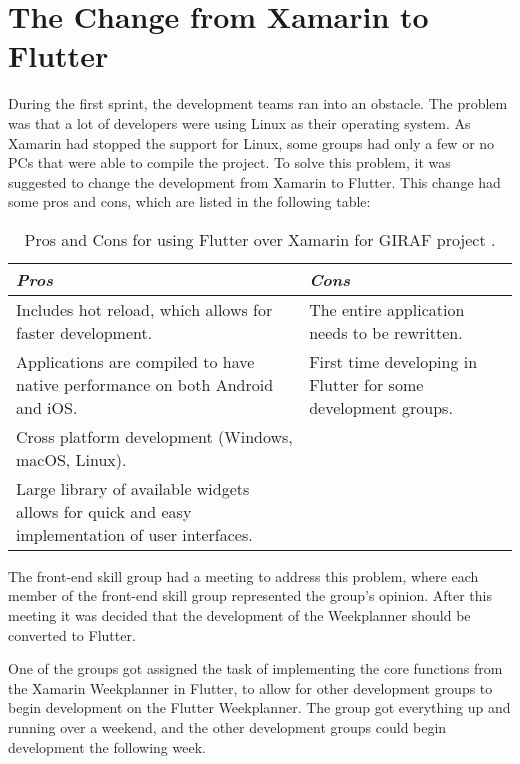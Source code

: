 \section{The Change from Xamarin to Flutter}
\label{sect:XamarinToFlutter}

During the first sprint, the development teams ran into an obstacle. The problem was that a lot of developers were using Linux as their operating system. As Xamarin had stopped the support for Linux, some groups had only a few or no PCs that were able to compile the project.
To solve this problem, it was suggested to change the development from Xamarin to Flutter. This change had some pros and cons, which are listed in the following table:
 
\begin{table}[ht]
\begin{tabularx}{\textwidth-7pt}{X|X}
\textit{Pros}    & \textit{Cons}  \\ \hline
Includes hot reload, which allows for faster development. & The entire application needs to be rewritten. \\ \hline
Applications are compiled to have native performance on both Android and iOS. &  First time developing in Flutter for some development groups. \\ \hline
Cross platform development (Windows, macOS, Linux). & \cellcolor{Gray}\\ \hline
Large library of available widgets allows for quick and easy implementation of user interfaces. & \cellcolor{Gray}\\
\end{tabularx}
\caption{Pros and Cons for using Flutter over Xamarin for GIRAF project \citep{cite:FlutterDEV}.}
\end{table}

The front-end skill group had a meeting to address this problem, where each member of the front-end skill group represented the group's opinion. After this meeting it was decided that the development of the Weekplanner should be converted to Flutter.

One of the groups got assigned the task of implementing the core functions from the Xamarin Weekplanner in Flutter, to allow for other development groups to begin development on the Flutter Weekplanner. The group got everything up and running over a weekend, and the other development groups could begin development the following week.

